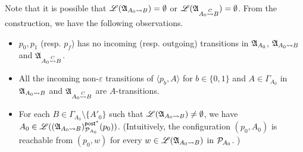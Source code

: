 Note that it is possible that ${\mathscr{L} }({\mathfrak{A} }_{A_0\rightsquigarrow B}) =\emptyset$ or ${\mathscr{L} }({\mathfrak{A} }_{A_0\stackrel{C}\rightsquigarrow B})=\emptyset$. From the construction, we have the following observations. 
\begin{itemize}
    \item $p_0,p_1$ (resp. $p_f$) has no incoming (resp. outgoing) transitions in ${\mathfrak{A} }_{A_0}$, ${\mathfrak{A} }_{A_0\rightsquigarrow B}$ and ${\mathfrak{A} }_{A_0\stackrel{C}\rightsquigarrow B}$.
    \item All the incoming non-$\varepsilon$ transitions of $\langle p_b, A\rangle$ for $b \in \{0,1\}$ and $A \in \Gamma_{A_0}$ in ${\mathfrak{A} }_{A_0\rightsquigarrow B}$ and ${\mathfrak{A} }_{A_0\stackrel{C}\rightsquigarrow B}$ are $A$-transitions.
    \item For each $B \in \Gamma_{A_0} \setminus \{A'_0\}$ such that ${\mathscr{L} }({\mathfrak{A} }_{A_0 \rightsquigarrow B}) \neq \emptyset$,  we have $A_0 \in {\mathscr{L} }(({\mathfrak{A} }_{A_0 \rightsquigarrow B})^{{\mathsf{post} }^*}_{{\mathcal{P} }_{A_0}}(p_0))$.  (Intuitively, the configuration $(p_0, A_0)$ is reachable from $(p_0, w)$ for every $w \in {\mathscr{L} }({\mathfrak{A} }_{A_0 \rightsquigarrow B})$ in ${\mathcal{P} }_{A_0}$. ) 
\end{itemize}


